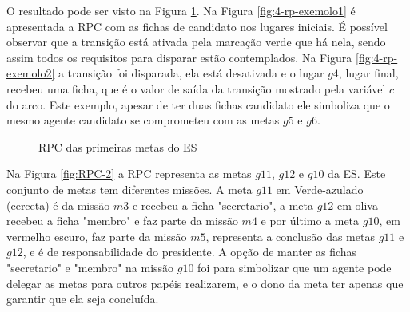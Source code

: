 O resultado pode ser visto na Figura \ref{fig:RPC-1}. Na Figura \ref{fig:4-rp-exemolo1} é apresentada a RPC com as fichas de candidato nos lugares iniciais. É possível observar que a transição está ativada pela marcação verde que há nela, sendo assim todos os requisitos para disparar estão contemplados. Na Figura \ref{fig:4-rp-exemolo2} a transição foi disparada, ela está desativada e o lugar $g4$, lugar final, recebeu uma ficha, que é o valor de saída da transição mostrado pela variável $c$ do arco. Este exemplo, apesar de ter duas fichas candidato ele simboliza que o mesmo agente candidato se comprometeu com as metas $g5$ e $g6$.

\begin{figure}[ht]
  \centering
  \caption{RPC das primeiras metas do ES}
  \label{fig:RPC-1}
\end{figure}

Na Figura \ref{fig:RPC-2} a RPC representa as metas $g11$, $g12$ e $g10$ da ES. Este conjunto de metas tem diferentes missões. A meta $g11$ em Verde-azulado (cerceta) é da missão $m3$ e recebeu a ficha "secretario", a meta $g12$ em oliva recebeu a ficha "membro" e faz parte da missão $m4$ e por último a meta $g10$, em vermelho escuro, faz parte da missão $m5$, representa a conclusão das metas $g11$ e $g12$, e é de responsabilidade do presidente. A opção de manter as fichas "secretario" e "membro" na missão $g10$ foi para simbolizar que um agente pode delegar as metas para outros papéis realizarem, e o dono da meta ter apenas que garantir que ela seja concluída.


